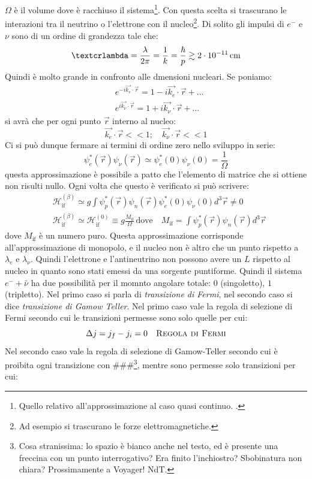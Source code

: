 $\Omega$ è il volume dove è racchiuso il sistema\footnote{Quello relativo 
all'approssimazione al caso quasi continuo. .}.
Con questa scelta si trascurano le interazioni tra il neutrino o l'elettrone 
con il nucleo\footnote{Ad esempio si trascurano le forze elettromagnetiche. }.
Di solito gli impulsi di $e^-$ e $\nu$ sono di un ordine di grandezza tale che:
\[ 
\text{\textcrlambda}=\frac{\lambda}{2\pi}=\frac{1}{k}=\frac{\hbar}{p}\gtrsim2
\cdot10^{-11}\,\si{\centi\meter}
\]
Quindi \textcrlambda è molto grande in confronto alle dmensioni nucleari. Se 
poniamo:
\begin{align*}
&e^{-i\vec{k_e}\cdot\vec{r}}=1-i\vec{k_e}\cdot\vec{r}+\dots\\
&e^{i\vec{k_{\nu}}\cdot\vec{r}}=1+i\vec{k_{\nu}}\cdot\vec{r}+\dots
\end{align*}
si avrà che per ogni punto $\vec{r}$ interno al nucleo:
\[
\vec{k_e}\cdot\vec{r}<<1;\quad\vec{k_{\nu}}\cdot\vec{r}<<1
\]
Ci si può dunque fermare ai termini di ordine zero nello sviluppo in serie:
\[
\psi_e^*(\vec{r})\psi_{\nu}(\vec{r})\simeq\psi_e^*(0)\psi_{\nu}(0)=\frac{1}{\Omega}
\]
questa approssimazione è possibile a patto che l'elemento di matrice che si 
ottiene non risulti nullo. Ogni volta che questo è verificato si può scrivere:
\begin{align*}
&\mathcal{H}_{\text{if}}^{(\beta)}\simeq 
g\int\psi_p^*(\vec{r})\psi_n(\vec{r})\psi_e^*(0)\psi_{\nu}(0)d^3\vec{r}\neq0\\
&\mathcal{H}_{\text{if}}^{(\beta)}\simeq\mathcal{H}_{\text{if}}^{(0)}\equiv 
g\frac{M_{\text{if}}}{\Omega}\,\text{dove}\quad 
M_{\text{if}}=\int\psi_p^*(\vec{r})\psi_n(\vec{r})d^3\vec{r}
\end{align*}
dove $M_{\text{if}}$ è un numero puro. Questa approssimazione corrisponde 
all'approssimazione di monopolo, e il nucleo non è altro che un punto rispetto 
a $\lambda_e$ e $\lambda_{\nu}$.
Quindi l'elettrone e l'antineutrino non possono avere un $L$ rispetto al nucleo
in quanto sono stati emessi da una sorgente puntiforme. Quindi il sistema 
$e^-+\bar{\nu}$ ha due possibilità
per il momnto angolare totale: $0$ (singoletto), $1$ (tripletto). Nel primo caso
si parla di \textit{transizione di Fermi}, nel secondo caso si dice 
\textit{transizione di Gamow Teller}.
Nel primo caso vale la regola di selezione di Fermi secondo cui le transizioni 
permesse sono solo quelle per cui:
\[
  \Delta j=j_f-j_i=0\quad\text{\textsc{Regola di Fermi}}
\]
Nel secondo caso vale la regola di selezione di Gamow-Teller secondo cui è
proibita ogni transizione con \#\#\#\footnote{Cosa stranissima: lo spazio è
bianco anche nel testo, ed è presente una freccina
con un punto interrogativo? Era finito l'inchiostro? Sbobinatura non chiara?
Prossimamente a Voyager! NdT.}, mentre sono permesse solo transizioni per cui:
